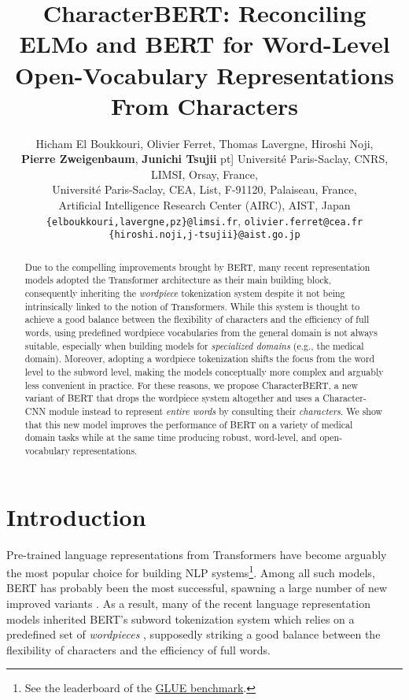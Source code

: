 \documentclass[11pt]{article}
\title{CharacterBERT: Reconciling ELMo and BERT for Word-Level Open-Vocabulary Representations From Characters}
\author{
  Hicham El Boukkouri, Olivier Ferret, Thomas Lavergne, Hiroshi Noji,\\ \textbf{Pierre Zweigenbaum}, \textbf{Junichi Tsujii} \6pt]
  Universit\'e Paris-Saclay, CNRS, LIMSI, Orsay, France,\\
Universit\'e Paris-Saclay, CEA, List, F-91120, Palaiseau, France, \\
  Artificial Intelligence Research Center (AIRC), AIST, Japan \\
  \texttt{\{elboukkouri,lavergne,pz\}@limsi.fr},  \texttt{olivier.ferret@cea.fr}\\ 
  \texttt{\{hiroshi.noji,j-tsujii\}@aist.go.jp}\\ 
  }
\date{}
\begin{document}
\maketitle

\begin{abstract}
Due to the compelling improvements brought by BERT, many recent representation models adopted the Transformer architecture as their main building block, consequently inheriting the \textit{wordpiece} tokenization system despite it not being intrinsically linked to the notion of Transformers. While this system is thought to achieve a good balance between the flexibility of characters and the efficiency of full words, using predefined wordpiece vocabularies from the general domain is not always suitable, especially when building models for \textit{specialized domains} (e.g., the medical domain). Moreover, adopting a wordpiece tokenization shifts the focus from the word level to the subword level, making the models conceptually more complex and arguably less convenient in practice. For these reasons, we propose CharacterBERT, a new variant of BERT that drops the wordpiece system altogether and uses a Character-CNN module instead to represent \textit{entire words} by consulting their \textit{characters}. We show that this new model improves the performance of BERT on a variety of medical domain tasks while at the same time producing robust, word-level, and open-vocabulary representations. 
\end{abstract}

\section{Introduction}
Pre-trained language representations from Transformers \cite{vaswani2017attention} have become arguably the most popular choice for building NLP systems\footnote{See the leaderboard of the \href{https://gluebenchmark.com/leaderboard}{GLUE benchmark}.}. Among all such models, BERT \cite{devlin-etal-2019-bert} has probably been the most successful, spawning a large number of new improved variants \cite{liu2019roberta,lan2019albert,sun2019ernie,zhang2019ernie,clark2020electra}. As a result, many of the recent language representation models inherited BERT's subword tokenization system which relies on a predefined set of \textit{wordpieces} \cite{wu2016google}, supposedly striking a good balance between the flexibility of characters and the efficiency of full words.
\end{document}
